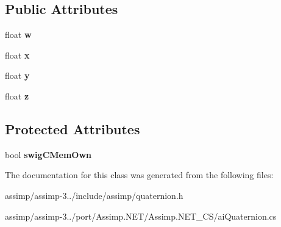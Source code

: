 \subsection*{Public Attributes}
\begin{DoxyCompactItemize}
\item 
\hypertarget{structai_quaternion_a410b3c46417d67d728a01a5810907a36}{float {\bfseries w}}\label{structai_quaternion_a410b3c46417d67d728a01a5810907a36}

\item 
\hypertarget{structai_quaternion_af9db21b086c14d8654d62005f740e75f}{float {\bfseries x}}\label{structai_quaternion_af9db21b086c14d8654d62005f740e75f}

\item 
\hypertarget{structai_quaternion_a1695fefbc60becf95fcafcc08573ab44}{float {\bfseries y}}\label{structai_quaternion_a1695fefbc60becf95fcafcc08573ab44}

\item 
\hypertarget{structai_quaternion_acc30da6103d5131fb1bed6640f1eeda0}{float {\bfseries z}}\label{structai_quaternion_acc30da6103d5131fb1bed6640f1eeda0}

\end{DoxyCompactItemize}
\subsection*{Protected Attributes}
\begin{DoxyCompactItemize}
\item 
\hypertarget{structai_quaternion_a34df7277ae81171fd4af63dd7628bb32}{bool {\bfseries swig\+C\+Mem\+Own}}\label{structai_quaternion_a34df7277ae81171fd4af63dd7628bb32}

\end{DoxyCompactItemize}


The documentation for this class was generated from the following files\+:\begin{DoxyCompactItemize}
\item 
assimp/assimp-\/3../include/assimp/quaternion.\+h\item 
assimp/assimp-\/3../port/\+Assimp.\+N\+E\+T/\+Assimp.\+N\+E\+T\+\_\+\+C\+S/ai\+Quaternion.\+cs\end{DoxyCompactItemize}
